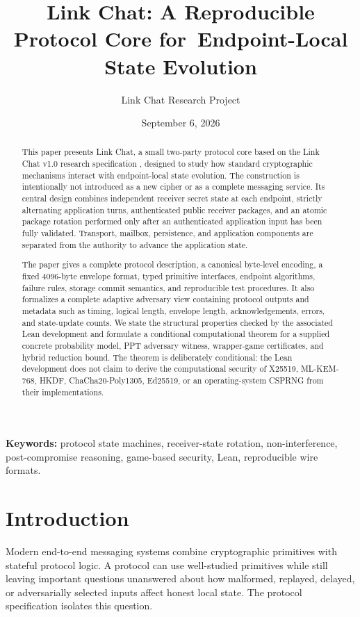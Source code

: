 \documentclass[11pt,letterpaper]{article}
\title{Link Chat: A Reproducible Protocol Core for\
Endpoint-Local State Evolution}
\author{Link Chat Research Project}
\date{September 6, 2026}
\begin{document}
\maketitle

\begin{abstract}
This paper presents Link Chat, a small two-party protocol core based on the Link Chat v1.0
research specification \cite{linkchat-spec}, designed to study how
standard cryptographic mechanisms interact with endpoint-local state evolution. The
construction is intentionally not introduced as a new cipher or as a complete messaging
service. Its central design combines independent receiver secret state at each endpoint,
strictly alternating application turns, authenticated public receiver packages, and an
atomic package rotation performed only after an authenticated application input has been
fully validated. Transport, mailbox, persistence, and application components are separated
from the authority to advance the application state.

The paper gives a complete protocol description, a canonical byte-level encoding, a fixed
4096-byte envelope format, typed primitive interfaces, endpoint algorithms, failure rules,
storage commit semantics, and reproducible test procedures. It also formalizes a complete
adaptive adversary view containing protocol outputs and metadata such as timing, logical
length, envelope length, acknowledgements, errors, and state-update counts. We state the
structural properties checked by the associated Lean development and formulate a
conditional computational theorem for a supplied concrete probability model, PPT
adversary witness, wrapper-game certificates, and hybrid reduction bound. The theorem is
deliberately conditional: the Lean development does not claim to derive the computational
security of X25519, ML-KEM-768, HKDF, ChaCha20-Poly1305, Ed25519, or an operating-system
CSPRNG from their implementations.
\end{abstract}

\noindent\textbf{Keywords:} protocol state machines, receiver-state rotation, non-interference,
post-compromise reasoning, game-based security, Lean, reproducible wire formats.

\tableofcontents

\section{Introduction}
\label{sec:introduction}

Modern end-to-end messaging systems combine cryptographic primitives with stateful
protocol logic. A protocol can use well-studied primitives while still leaving important
questions unanswered about how malformed, replayed, delayed, or adversarially selected
inputs affect honest local state. The protocol specification isolates
this question.
\end{document}
